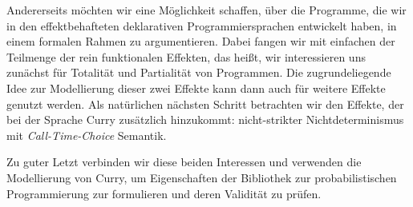 Andererseits m\"ochten wir eine M\"oglichkeit schaffen, \"uber die
Programme, die wir in den effektbehafteten deklarativen
Programmiersprachen entwickelt haben, in einem formalen Rahmen zu
argumentieren.
Dabei fangen wir mit einfachen der Teilmenge der rein funktionalen
Effekten, das hei\ss{}t, wir interessieren uns zun\"achst f\"ur
Totalit\"at und Partialit\"at von Programmen.
Die zugrundeliegende Idee zur Modellierung dieser zwei Effekte kann
dann auch f\"ur weitere Effekte genutzt werden.
Als nat\"urlichen n\"achsten Schritt betrachten wir den Effekte, der
bei der Sprache Curry zus\"atzlich hinzukommt: nicht-strikter
Nichtdeterminismus mit \emph{Call-Time-Choice} Semantik.

Zu guter Letzt verbinden wir diese beiden Interessen und verwenden die
Modellierung von Curry, um Eigenschaften der Bibliothek zur
probabilistischen Programmierung zur formulieren und deren Validit\"at
zu pr\"ufen.

\endgroup